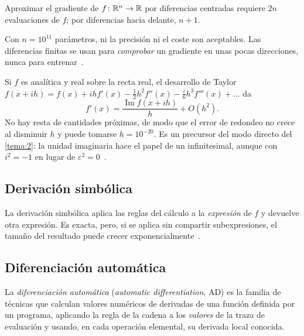 \begin{proposicion}\label{prop:coste-fd}
Aproximar el gradiente de $f\colon\mathbb{R}^{n}\to\mathbb{R}$ por diferencias centradas requiere $2n$ evaluaciones de $f$; por diferencias hacia delante, $n+1$.
\end{proposicion}

Con $n=10^{11}$ parámetros, ni la precisión ni el coste son aceptables. Las diferencias finitas se usan para \emph{comprobar} un gradiente en unas pocas direcciones, nunca para entrenar~\cite[§2.1]{baydin}.

\begin{observacion}\label{obs:paso-complejo}
Si $f$ es analítica y real sobre la recta real, el desarrollo de Taylor $f(x+ih)=f(x)+ihf'(x)-\tfrac12h^{2}f''(x)-\tfrac{i}{6}h^{3}f'''(x)+\dots$ da
\[
f'(x)=\frac{\operatorname{Im}f(x+ih)}{h}+O(h^{2}).
\]
No hay resta de cantidades próximas, de modo que el error de redondeo no crece al disminuir $h$ y puede tomarse $h=10^{-20}$. Es un precursor del modo directo del \cref{tema:2}: la unidad imaginaria hace el papel de un infinitesimal, aunque con $i^{2}=-1$ en lugar de $\varepsilon^{2}=0$~\cite{mit18337}.
\end{observacion}

\subsection{Derivación simbólica}

La derivación simbólica aplica las reglas del cálculo a la \emph{expresión} de $f$ y devuelve otra expresión. Es exacta, pero, si se aplica sin compartir subexpresiones, el tamaño del resultado puede crecer exponencialmente~\cite[§2.2]{baydin}.

\addtocounter{definicion}{1}%

\subsection{Diferenciación automática}

\begin{definicion}\label{def:ad}
La \emph{diferenciación automática} (\emph{automatic differentiation}, AD) es la familia de técnicas que calculan valores numéricos de derivadas de una función definida por un programa, aplicando la regla de la cadena a los \emph{valores} de la traza de evaluación y usando, en cada operación elemental, su derivada local conocida.
\end{definicion}

